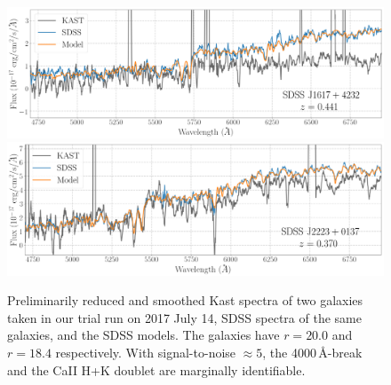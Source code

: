 \documentclass[letterpaper,12pt]{article}
\begin{document}
\begin{figure}[hbt]
\includegraphics[width=6in]{J1617.pdf}
\includegraphics[width=6in]{J2223.pdf}
\caption{
Preliminarily reduced and smoothed Kast spectra of two galaxies taken in our trial run on 2017 July 14, SDSS
spectra of the same galaxies, and the SDSS models. The galaxies have $r=20.0$ and $r=18.4$ respectively. With
signal-to-noise $\approx5$, the 4000\,\AA-break and the CaII H+K doublet are marginally identifiable.}
\end{figure}
\end{document}
